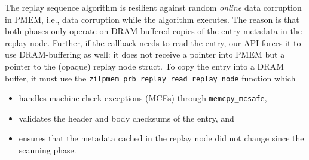 \documentclass[12pt,a4paper,twoside]{book}
\begin{document}


The replay sequence algorithm is resilient against random \textit{online} data corruption in PMEM, i.e., data corruption while the algorithm executes.
The reason is that both phases only operate on DRAM-buffered copies of the entry metadata in the replay node.
Further, if the callback needs to read the entry, our API forces it to use DRAM-buffering as well:
it does not receive a pointer into PMEM but a pointer to the (opaque) replay node struct.
To copy the entry into a DRAM buffer, it must use the \lstinline{zilpmem_prb_replay_read_replay_node} function which
\begin{itemize}[noitemsep]
    \item handles machine-check exceptions (MCEs) through \lstinline{memcpy_mcsafe},
    \item validates the header and body checksums of the entry, and
    \item ensures that the metadata cached in the replay node did not change since the scanning phase.
\end{itemize}
\end{document}
